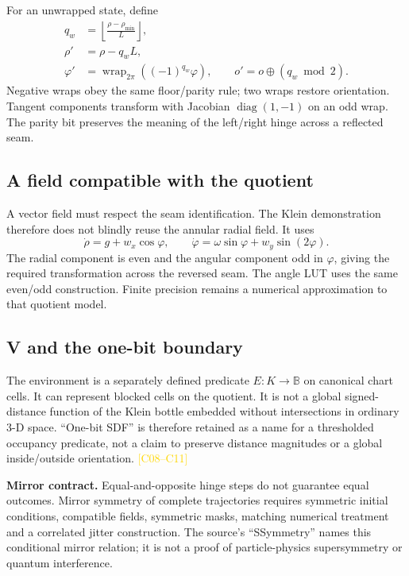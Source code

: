 \documentclass[11pt,a4paper]{article}
\newcommand{\corr}[1]{\textcolor{gold}{\textsf{[#1]}}}
\newcommand{\ph}{\varphi}
\newcommand{\wrap}{\operatorname{wrap}}
\newcommand{\B}{\mathbb B}
\begin{document}
For an unwrapped state, define
\begin{align}
 q_w&=\left\lfloor\frac{\rho-\rho_{\min}}{L}\right\rfloor,\\
 \rho'&=\rho-q_wL,\\
 \ph'&=\wrap_{2\pi}((-1)^{q_w}\ph),\qquad
 o'=o\oplus(q_w\bmod2).
\end{align}
Negative wraps obey the same floor/parity rule; two wraps restore orientation. Tangent components transform with Jacobian $\operatorname{diag}(1,-1)$ on an odd wrap. The parity bit preserves the meaning of the left/right hinge across a reflected seam.

\subsection{A field compatible with the quotient}
A vector field must respect the seam identification. The Klein demonstration therefore does not blindly reuse the annular radial field. It uses
\begin{equation}
 \dot\rho=g+w_x\cos\ph,\qquad
 \dot\ph=\omega\sin\ph+w_y\sin(2\ph).
\end{equation}
The radial component is even and the angular component odd in $\ph$, giving the required transformation across the reversed seam. The angle LUT uses the same even/odd construction. Finite precision remains a numerical approximation to that quotient model.

\subsection{V and the one-bit boundary}
The environment is a separately defined predicate $E:K\to\B$ on canonical chart cells. It can represent blocked cells on the quotient. It is not a global signed-distance function of the Klein bottle embedded without intersections in ordinary 3-D space. ``One-bit SDF'' is therefore retained as a name for a thresholded occupancy predicate, not a claim to preserve distance magnitudes or a global inside/outside orientation. \corr{C08--C11}

\begin{contract}
\textbf{Mirror contract.} Equal-and-opposite hinge steps do not guarantee equal outcomes. Mirror symmetry of complete trajectories requires symmetric initial conditions, compatible fields, symmetric masks, matching numerical treatment and a correlated jitter construction. The source's ``SSymmetry'' names this conditional mirror relation; it is not a proof of particle-physics supersymmetry or quantum interference.
\end{contract}
\clearpage
\end{document}
